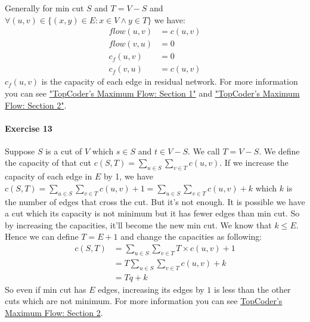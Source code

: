 \documentclass{book}
\begin{document}
	Generally for min cut $S$ and $T = V - S$ and $\forall (u, v) \in \{(x, y) \in E : x \in V \land y \in T \}$ we have:
	\begin{equation*}
		\begin{split}
		flow(u, v) &= c(u, v) \\
		flow(v, u) &= 0 \\
		c_f(u, v) &= 0 \\
		c_f(v, u) &= c(u, v)
		\end{split}		
	\end{equation*}
	$c_f(u, v)$ is the capacity of each edge in residual network. For more information you can see \href{https://www.topcoder.com/community/data-science/data-science-tutorials/maximum-flow-section-1/}{"TopCoder's Maximum Flow: Section 1"} and \href{https://www.topcoder.com/community/data-science/data-science-tutorials/maximum-flow-section-2/}{"TopCoder's Maximum Flow: Section 2"}.
	\paragraph{Exercise 13}
	Suppose $S$ is a cut of $V$ which $s \in S$ and $t \in V - S$. We call $T = V - S$. We define the capacity of that cut $c(S, T) = \sum_{u \in S}\sum_{v \in T}c(u, v)$. If we increase the capacity of each edge in $E$ by 1, we have $c(S, T) = \sum_{u \in S}\sum_{v \in T}{c(u, v) + 1} = \sum_{u \in S}\sum_{v \in T}{c(u, v)} + k$ which $k$ is the number of edges that cross the cut. But it's not enough. It is possible we have a cut which its capacity is not minimum but it has fewer edges than min cut. So by increasing the capacities, it'll become the new min cut. We know that $k \le E$. Hence we can define $T = E + 1$ and change the capacities as following:
	\begin{equation*}
		\begin{split}
		c(S, T) &= \sum_{u \in S}\sum_{v \in T}{T \times c(u, v) + 1} \\
		&= T \sum_{u \in S}\sum_{v \in T}{c(u, v)} + k \\
		&= Tq + k
		\end{split}
	\end{equation*}
	So even if min cut has $E$ edges, increasing its edges by $1$ is less than the other cuts which are not minimum. For more information you can see \href{https://www.topcoder.com/community/data-science/data-science-tutorials/maximum-flow-section-2/}{TopCoder's Maximum Flow: Section 2}.
\end{document}
